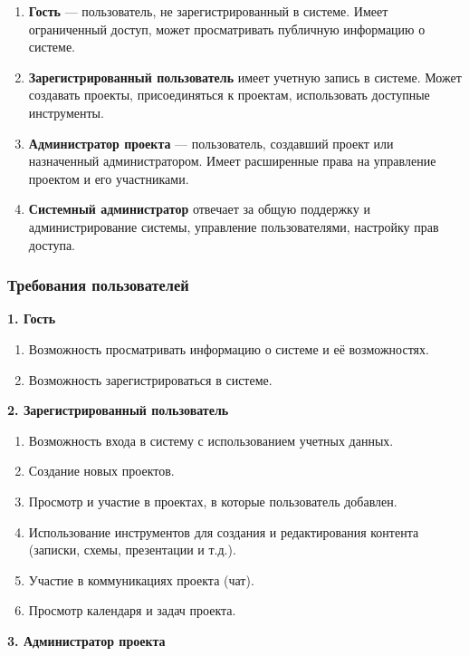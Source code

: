 \begin{enumerate}[leftmargin=1.6\parindent]
    \item \textbf{Гость} --- пользователь, не зарегистрированный в системе. Имеет ограниченный доступ, может просматривать публичную информацию о системе.
    \item \textbf{Зарегистрированный пользователь} имеет учетную запись в системе. Может создавать проекты, присоединяться к проектам, использовать доступные инструменты.
    \item \textbf{Администратор проекта} --- пользователь, создавший проект или назначенный администратором. Имеет расширенные права на управление проектом и его участниками.
    \item \textbf{Системный администратор} отвечает за общую поддержку и администрирование системы, управление пользователями, настройку прав доступа.
\end{enumerate}

\subsubsection{Требования пользователей}

\textbf{1. Гость}

\begin{enumerate}[leftmargin=1.6\parindent]
    \item Возможность просматривать информацию о системе и её возможностях.
    \item Возможность зарегистрироваться в системе.
\end{enumerate}

\textbf{2. Зарегистрированный пользователь}

\begin{enumerate}[leftmargin=1.6\parindent]
    \item Возможность входа в систему с использованием учетных данных.
    \item Создание новых проектов.
    \item Просмотр и участие в проектах, в которые пользователь добавлен.
    \item Использование инструментов для создания и редактирования контента (записки, схемы, презентации и т.д.).
    \item Участие в коммуникациях проекта (чат).
    \item Просмотр календаря и задач проекта.
\end{enumerate}

\textbf{3. Администратор проекта}

